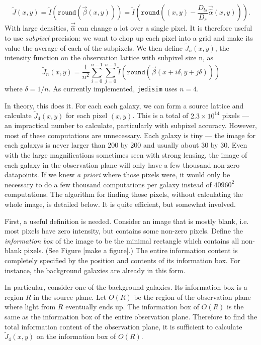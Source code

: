 \documentclass[10pt,twoside]{article}
\theoremstyle{definition}
\theoremstyle{exercise}
\begin{document}
\begin{equation}
  \tilde{J}(x,y) = \tilde{I}\left( \texttt{round}\left( \vec{\beta}(x,y) \right)\right) = \tilde{I}\left(\texttt{round} \left( (x,y)- \frac{D_{ls}}{D_s} \vec{\hat{\alpha}}(x,y)  \right)\right).
  \label{eq:discrete_lens_intensity_eq}
\end{equation}
With large densities, $\vec{\hat{\alpha}}$ can change a lot over a single pixel. It is therefore useful to use \textit{subpixel} precision: we want to chop up each pixel into a grid and make its value the average of each of the subpixels. We then define $\tilde{J}_n(x,y)$, the intensity function on the observation lattice with subpixel size n, as
\begin{equation}
  \tilde{J}_n(x,y) = \frac{1}{n^2}\sum_{i=0}^{n-1}\sum_{j=0}^{n-1} \tilde{I}\left( \texttt{round}\left( \vec{\beta}(x+i\delta,y+j\delta) \right)\right)
  \label{eq:discrete_subpixel_lens_intensity_eq}
\end{equation}
where $\delta = 1/n$. As currently implemented, \texttt{jedisim} uses $n=4$.

In theory, this does it. For each each galaxy, we can form a source lattice and calculate $\tilde{J}_4(x,y)$ for each pixel $(x,y)$. This is a total of $2.3 \times 10^{14}$ pixels --- an impractical number to calculate, particularly with subpixel accuracy. However, most of these computations are unnecessary. Each galaxy is tiny --- the image for each galaxys is never larger than 200 by 200 and usually about 30 by 30. Even with the large magnifications sometimes seen with strong lensing, the image of each galaxy in the observation plane will only have a few thousand non-zero datapoints. If we knew \textit{a priori} where those pixels were, it would only be necessary to do a few thousand computations per galaxy instead of $40960^2$ computations. The algorithm for finding those pixels, without calculating the whole image, is detailed below. It is quite efficient, but somewhat involved.

First, a useful definition is needed. Consider an image that is mostly blank, i.e. most pixels have zero intensity, but contains some non-zero pixels. Define the \textit{information box} of the image to be the minimal rectangle which contains all non-blank pixels. (See Figure [make a figure].) The entire information content is completely specified by the position and contents of its information box. For instance, the background galaxies are already in this form.

In particular, consider one of the background galaxies. Its information box is a region $R$ in the source plane. Let $O(R)$ be the region of the observation plane where light from $R$ eventually ends up. The information box of $O(R)$ is the same as the information box of the entire observation plane. Therefore to find the total information content of the observation plane, it is sufficient to calculate $\tilde{J}_4(x,y)$ on the information box of $O(R)$.
\end{document}
